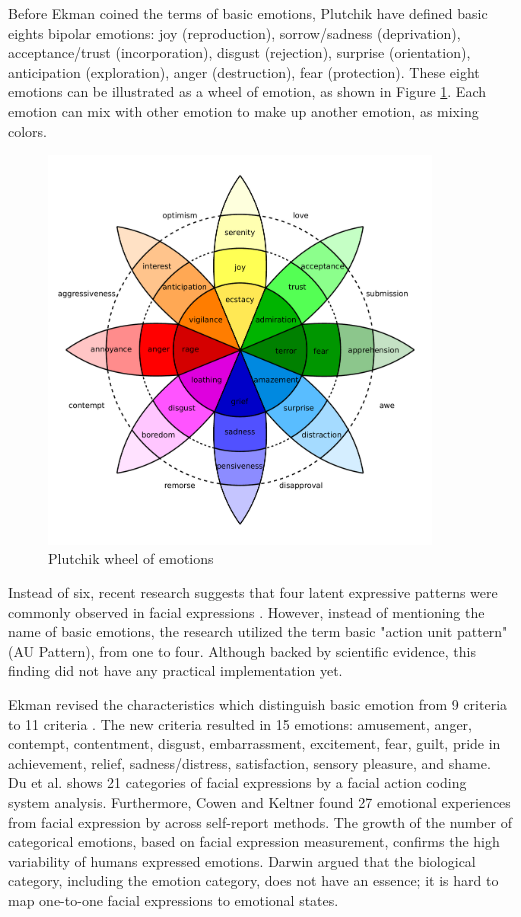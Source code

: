 Before Ekman coined the terms of basic emotions, Plutchik
\cite{plutchik1980emotion} have defined basic eights bipolar emotions: joy
(reproduction), sorrow/sadness (deprivation), acceptance/trust (incorporation),
disgust (rejection), surprise (orientation), anticipation (exploration), anger
(destruction), fear (protection). These eight emotions can be illustrated as a
wheel of emotion, as shown in Figure \ref{fig:plutchik_model}. Each emotion can
mix with other emotion to make up another emotion, as mixing colors. 

\begin{figure}[htbp]
    \centering
    \includegraphics[width=4in]{../fig/plutchik_model.pdf}
    \caption{Plutchik wheel of emotions}
    \label{fig:plutchik_model}
\end{figure}

Instead of six, recent research suggests that four latent expressive patterns
were commonly observed in facial expressions \cite{Jack2016}. However, instead
of mentioning the name of basic emotions, the research utilized the term basic
"action unit pattern" (AU Pattern), from one to four. Although backed by
scientific evidence, this finding did not have any practical implementation
yet.

Ekman revised the characteristics which distinguish basic emotion from 9
criteria \cite{Ekman1992} to 11 criteria \cite{Ekman2005}. The new criteria
resulted in 15 emotions: amusement, anger, contempt, contentment, disgust,
embarrassment, excitement, fear, guilt, pride in achievement, relief,
sadness/distress, satisfaction, sensory pleasure, and shame. Du et al. 
\cite{Du2014} shows 21 categories of facial expressions by a facial action
coding system analysis. Furthermore, Cowen and Keltner \cite{Cowen2017} found
27 emotional experiences from facial expression by across self-report methods.
The growth of the number of categorical emotions, based on facial expression
measurement, confirms the high variability of humans expressed emotions. Darwin
argued that the biological category, including the emotion category, does not
have an essence; it is hard to map one-to-one facial expressions to emotional
states.

